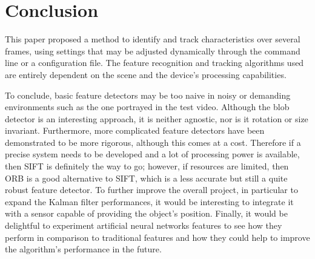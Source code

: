 \documentclass[journal]{IEEEtran}
\begin{document}
\section{Conclusion}
\label{sec:conclusion}
This paper proposed a method to identify and track characteristics over several frames, using settings that may be adjusted dynamically through the command line or a configuration file.
The feature recognition and tracking algorithms used are entirely dependent on the scene and the device's processing capabilities. 

To conclude, basic feature detectors may be too naive in noisy or demanding environments such as the one portrayed in the test video.
Although the blob detector is an interesting approach, it is neither agnostic, nor is it rotation or size invariant.
Furthermore, more complicated feature detectors have been demonstrated to be more rigorous, although this comes at a cost.
Therefore if a precise system needs to be developed and a lot of processing power is available, then SIFT is definitely the way to go; however, if resources are limited, then ORB is a good alternative to SIFT, which is a less accurate but still a quite robust feature detector. 
To further improve the overall project, in particular to expand the Kalman filter performances, it would be interesting to integrate it with a sensor capable of providing the object's position.
Finally, it would be delightful to experiment artificial neural networks features to see how they perform in comparison to traditional features and how they could help to improve the algorithm's performance in the future.




\ifCLASSOPTIONcaptionsoff
  \newpage
\fi
\end{document}
